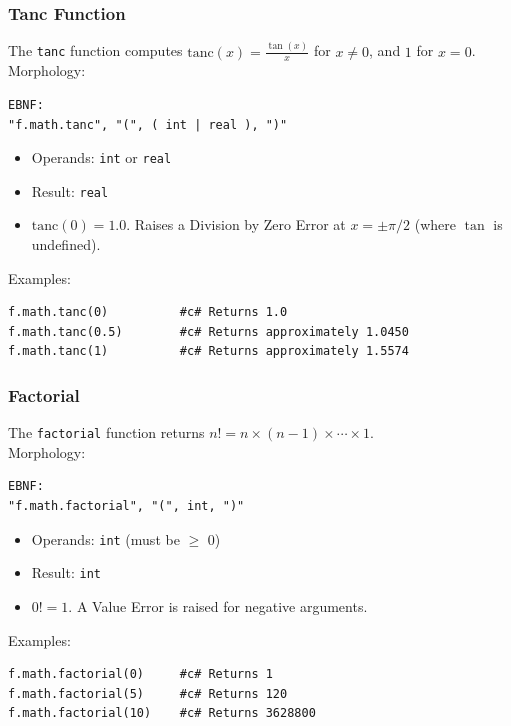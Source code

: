 \subsubsection{Tanc Function}
The \texttt{tanc} function computes $\text{tanc}(x) = \frac{\tan(x)}{x}$ for $x \neq 0$, and $1$ for $x = 0$. \\
Morphology:
\begin{verbatim}
EBNF:
"f.math.tanc", "(", ( int | real ), ")"
\end{verbatim}
\begin{itemize}
\item Operands: \texttt{int} or \texttt{real}
\item Result: \texttt{real}
\item $\text{tanc}(0) = 1.0$. Raises a Division by Zero Error at $x = \pm\pi/2$ (where $\tan$ is undefined).
\end{itemize}
Examples:
\begin{verbatim}
f.math.tanc(0)          #c# Returns 1.0
f.math.tanc(0.5)        #c# Returns approximately 1.0450
f.math.tanc(1)          #c# Returns approximately 1.5574
\end{verbatim}

\subsubsection{Factorial}
The \texttt{factorial} function returns $n! = n \times (n-1) \times \cdots \times 1$.\\
Morphology:
\begin{verbatim}
EBNF:
"f.math.factorial", "(", int, ")"
\end{verbatim}
\begin{itemize}
\item Operands: \texttt{int} (must be $\geq$ 0)
\item Result: \texttt{int}
\item $0! = 1$. A Value Error is raised for negative arguments.
\end{itemize}
Examples:
\begin{verbatim}
f.math.factorial(0)     #c# Returns 1
f.math.factorial(5)     #c# Returns 120
f.math.factorial(10)    #c# Returns 3628800
\end{verbatim}

